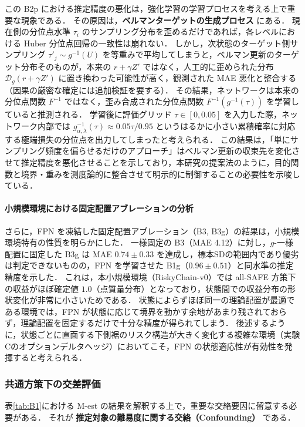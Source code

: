 \documentclass[a4paper,10pt]{jsarticle}
\theoremstyle{definition}
\renewcommand{\Finv}{F^{-1}}
\newcommand{\dist}{\mathcal{D}_g}
\begin{document}
この B2p における推定精度の悪化は，強化学習の学習プロセスを考える上で重要な現象である．
その原因は，\textbf{ベルマンターゲットの生成プロセス} にある．
現在側の分位点水準 $\tau_i$ のサンプリング分布を歪めるだけであれば，各レベルにおける Huber 分位点回帰の一致性は崩れない．
しかし，次状態のターゲット側サンプリング $\tau'_j \sim g^{-1}(U)$ を等重みで平均してしまうと，ベルマン更新のターゲット分布そのものが，本来の $r+\gamma Z'$ ではなく，人工的に歪められた分布 $\dist(r+\gamma Z')$ に置き換わった可能性が高く，観測された MAE 悪化と整合する（因果の厳密な確定には追加検証を要する）．
その結果，ネットワークは本来の分位点関数 $\Finv$ ではなく，歪み合成された分位点関数 $\Finv(g^{-1}(\tau))$ を学習していると推測される．
学習後に評価グリッド $\tau \in [0, 0.05]$ を入力した際，ネットワーク内部では $g^{-1}_{\alpha,\lambda}(\tau) \approx 0.05\tau / 0.95$ というはるかに小さい累積確率に対応する極端損失の分位点を出力してしまったと考えられる．
この結果は，「単にサンプリング頻度を偏らせるだけのアプローチ」はベルマン更新の収束先を変化させて推定精度を悪化させることを示しており，本研究の提案法のように，目的関数と境界・重みを測度論的に整合させて明示的に制御することの必要性を示唆している．

\paragraph{小規模環境における固定配置アブレーションの分析}
さらに，FPN を凍結した固定配置アブレーション（B3, B3g）の結果は，小規模環境特有の性質を明らかにした．
一様固定の B3（MAE 4.12）に対し，$g$-一様配置に固定した B3g は MAE $0.74 \pm 0.33$ を達成し，標本SDの範囲内であり優劣は判定できないものの，FPN を学習させた B1g（$0.96 \pm 0.51$）と同水準の推定精度を示した．
これは，本小規模環境（RiskyChain-v0）では all-SAFE 方策下の収益がほぼ確定値 $1.0$（点質量分布）となっており，状態間での収益分布の形状変化が非常に小さいためである．
状態によらずほぼ同一の理論配置が最適である環境では，FPN が状態に応じて境界を動かす余地があまり残されておらず，理論配置を固定するだけで十分な精度が得られてしまう．
後述するように，状態ごとに直面する下側裾のリスク構造が大きく変化する複雑な環境（実験Cのオプションデルタヘッジ）においてこそ，FPN の状態適応性が有効性を発揮すると考えられる．

\subsubsection{共通方策下の交差評価}
\label{subsec:cross}
表\ref{tab:B1}における M-est の結果を解釈する上で，重要な交絡要因に留意する必要がある．
それが \textbf{推定対象の難易度に関する交絡（Confounding）} である．
\end{document}
